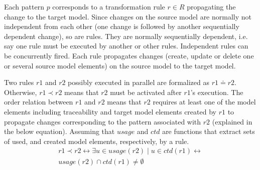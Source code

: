 Each pattern $p$ corresponds to a transformation rule $r \in R$ propagating the change to the target model. %
Since changes on the source model are normally not independent from each other (one change is followed by another sequentially dependent change), so are rules. They are normally sequentially dependent, i.e. say one rule must be executed by another or other rules. Independent rules can be concurrently fired. %
Each rule propagates changes (create, update or delete one or several source model elements) on the source model to the target model. 

Two rules $r1$ and $r2$ possibly executed in parallel are formalized as $r1 \doteq r2$. Otherwise, $r1 \prec r2$ means that $r2$ must be activated after $r1$'s execution. The order relation between $r1$ and $r2$ means that $r2$ requires at least one of the model elements including traceability and target model elements created by $r1$ to propagate changes corresponding to the pattern associated with $r2$ (explained in the below equation). Assuming that $usage$ and $ctd$ are functions that extract sets of used, and created model elements, respectively, by a rule.
\begin{align*}
r1 \prec r2 \leftrightarrow \exists u \in usage(r2) \mid u \in ctd(r1) \leftrightarrow \\ usage(r2) \cap ctd(r1) \neq \emptyset
\end{align*}  




 


